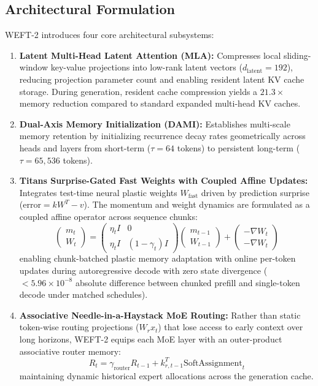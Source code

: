 \documentclass[11pt,a4paper]{article}
\begin{document}
\subsection{Architectural Formulation}
WEFT-2 introduces four core architectural subsystems:
\begin{enumerate}
    \item \textbf{Latent Multi-Head Latent Attention (MLA):} Compresses local sliding-window key-value projections into low-rank latent vectors ($d_{\text{latent}} = 192$), reducing projection parameter count and enabling resident latent KV cache storage. During generation, resident cache compression yields a $21.3\times$ memory reduction compared to standard expanded multi-head KV caches.
    \item \textbf{Dual-Axis Memory Initialization (DAMI):} Establishes multi-scale memory retention by initializing recurrence decay rates geometrically across heads and layers from short-term ($\tau = 64$ tokens) to persistent long-term ($\tau = 65{,}536$ tokens).
    \item \textbf{Titans Surprise-Gated Fast Weights with Coupled Affine Updates:} Integrates test-time neural plastic weights $W_{\text{fast}}$ driven by prediction surprise ($\text{error} = k W^T - v$). The momentum and weight dynamics are formulated as a coupled affine operator across sequence chunks:
    \begin{equation}
    \begin{pmatrix} m_t \\ W_t \end{pmatrix} = \begin{pmatrix} \eta_t I & 0 \\ \eta_t I & (1 - \gamma_t) I \end{pmatrix} \begin{pmatrix} m_{t-1} \\ W_{t-1} \end{pmatrix} + \begin{pmatrix} -\nabla W_t \\ -\nabla W_t \end{pmatrix}
    \end{equation}
    enabling chunk-batched plastic memory adaptation with online per-token updates during autoregressive decode with zero state divergence ($< 5.96 \times 10^{-8}$ absolute difference between chunked prefill and single-token decode under matched schedules).
    \item \textbf{Associative Needle-in-a-Haystack MoE Routing:} Rather than static token-wise routing projections ($W_r x_t$) that lose access to early context over long horizons, WEFT-2 equips each MoE layer with an outer-product associative router memory:
    \begin{equation}
    R_t = \gamma_{\text{router}} R_{t-1} + k_{r, t-1}^T \text{SoftAssignment}_t
    \end{equation}
    maintaining dynamic historical expert allocations across the generation cache.
\end{enumerate}
\end{document}
